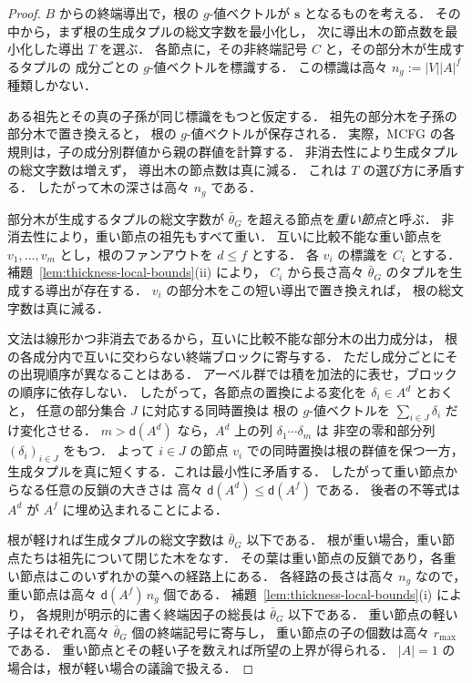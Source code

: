 \begin{proof}
$B$ からの終端導出で，根の $g$-値ベクトルが $\mathbf s$ となるものを考える．
その中から，まず根の生成タプルの総文字数を最小化し，
次に導出木の節点数を最小化した導出 $T$ を選ぶ．
各節点に，その非終端記号 $C$ と，その部分木が生成するタプルの
成分ごとの $g$-値ベクトルを標識する．
この標識は高々 $n_g:=|V||A|^f$ 種類しかない．

ある祖先とその真の子孫が同じ標識をもつと仮定する．
祖先の部分木を子孫の部分木で置き換えると，
根の $g$-値ベクトルが保存される．
実際，MCFG の各規則は，子の成分別群値から親の群値を計算する．
非消去性により生成タプルの総文字数は増えず，
導出木の節点数は真に減る．
これは $T$ の選び方に矛盾する．
したがって木の深さは高々 $n_g$ である．

部分木が生成するタプルの総文字数が
$\bar\theta_G$ を超える節点を\emph{重い節点}と呼ぶ．
非消去性により，重い節点の祖先もすべて重い．
互いに比較不能な重い節点を
$v_1,\ldots,v_m$ とし，根のファンアウトを $d\le f$ とする．
各 $v_i$ の標識を $C_i$ とする．
補題~\ref{lem:thickness-local-bounds}(ii) により，
$C_i$ から長さ高々 $\bar\theta_G$ のタプルを生成する導出が存在する．
$v_i$ の部分木をこの短い導出で置き換えれば，
根の総文字数は真に減る．

文法は線形かつ非消去であるから，互いに比較不能な部分木の出力成分は，
根の各成分内で互いに交わらない終端ブロックに寄与する．
ただし成分ごとにその出現順序が異なることはある．
アーベル群では積を加法的に表せ，ブロックの順序に依存しない．
したがって，各節点の置換による変化を
$\delta_i\in A^d$ とおくと，
任意の部分集合 $J$ に対応する同時置換は
根の $g$-値ベクトルを $\sum_{i\in J}\delta_i$ だけ変化させる．
$m>\mathsf d(A^d)$ なら，$A^d$ 上の列 $\delta_1\cdots\delta_m$ は
非空の零和部分列 $(\delta_i)_{i\in J}$ をもつ．
よって $i\in J$ の節点 $v_i$ での同時置換は根の群値を保つ一方，
生成タプルを真に短くする．これは最小性に矛盾する．
したがって重い節点からなる任意の反鎖の大きさは
高々 $\mathsf d(A^d)\le\mathsf d(A^f)$ である．
後者の不等式は $A^d$ が $A^f$ に埋め込まれることによる．

根が軽ければ生成タプルの総文字数は
$\bar\theta_G$ 以下である．
根が重い場合，重い節点たちは祖先について閉じた木をなす．
その葉は重い節点の反鎖であり，各重い節点はこのいずれかの葉への経路上にある．
各経路の長さは高々 $n_g$ なので，
重い節点は高々 $\mathsf d(A^f)\,n_g$ 個である．
補題~\ref{lem:thickness-local-bounds}(i) により，
各規則が明示的に書く終端因子の総長は
$\bar\theta_G$ 以下である．
重い節点の軽い子はそれぞれ高々
$\bar\theta_G$ 個の終端記号に寄与し，
重い節点の子の個数は高々 $r_{\max}$ である．
重い節点とその軽い子を数えれば所望の上界が得られる．
$|A|=1$ の場合は，根が軽い場合の議論で扱える．
\end{proof}

